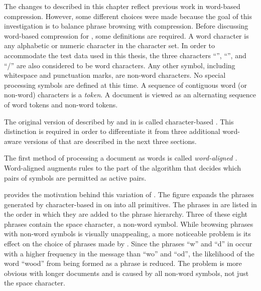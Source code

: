 The changes to \repair described in this chapter reflect
previous work in word-based compression.  However, some
different choices were made because the goal of this
investigation is to balance phrase browsing with compression.
Before discussing word-based compression for \repair,
some definitions are required.  A word character is any
alphabetic or numeric character in the \eascii character
set.  In order to accommodate the \sgml test 
data used in this thesis, the three characters ``\tl'', ``\tg'', 
and ``/'' are also considered to be word characters.  Any other 
symbol, including whitespace and punctuation marks, are 
non-word characters.  No special processing symbols are
defined at this time. 
A sequence of contiguous word (or non-word) 
characters is a {\emph {token}}.  A document is viewed as
an alternating sequence of word tokens and non-word tokens.

The original version of 
\repair described by \citet{lm00:procieee} and in
 is called character-based \repair.  This
distinction is required in order to differentiate it from
three additional word-aware versions of \repair that are 
described in the next three sections.


The first method of processing a document as words is called
{\emph {word-aligned \repair.}}  Word-aligned \repair augments
rules to the part of the \repair algorithm that decides
which pairs of symbols are permitted as active pairs.

 provides the motivation
behind this variation of \repair.  The figure expands the
phrases generated by character-based \repair in
 on  into 
all primitives.  The phrases in 
are listed in the order in which they are added to the phrase
hierarchy.  Three of these eight phrases contain the space character,
a non-word symbol.  While browsing phrases with non-word 
symbols is visually unappealing, a more noticeable problem is
its effect on the choice of phrases made by \repair.  Since the
phrases ``{\tvs}w'' and ``d{\tvs}'' in 
occur with a higher frequency in
the message than ``wo'' and ``od'', the likelihood of the word ``wood''
from being formed as a phrase is reduced.  The
problem is more obvious with longer documents and is caused 
by all non-word symbols, not just the space character.

